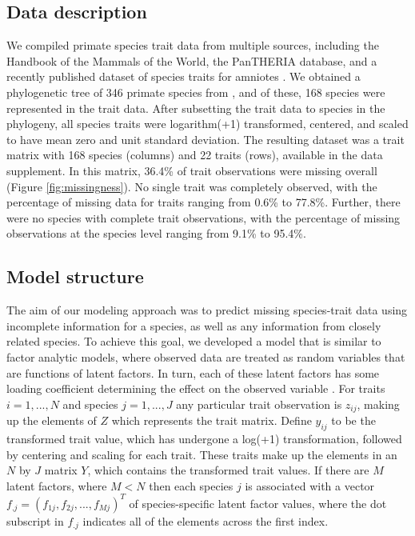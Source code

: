 \subsection{Data description}

We compiled primate species trait data from multiple sources, including the Handbook of the Mammals of the World, the PanTHERIA database, and a recently published dataset of species traits for amniotes \citep{myhrvold2015}.
We obtained a phylogenetic tree of 346 primate species from \cite{perelman2011}, and of these, 168 species were represented in the trait data.
After subsetting the trait data to species in the phylogeny, all species traits were logarithm(+1) transformed, centered, and scaled to have mean zero and unit standard deviation.
The resulting dataset was a trait matrix with 168 species (columns) and 22 traits (rows), available in the data supplement.
In this matrix, 36.4\% of trait observations were missing overall (Figure \ref{fig:missingness}).
No single trait was completely observed, with the percentage of missing data for traits ranging from 0.6\% to 77.8\%.
Further, there were no species with complete trait observations, with the percentage of missing observations at the species level ranging from 9.1\% to 95.4\%.

\subsection{Model structure}

The aim of our modeling approach was to predict missing species-trait data using incomplete information for a species, as well as any information from closely related species.
To achieve this goal, we developed a model that is similar to factor analytic models, where observed data are treated as random variables that are functions of latent factors. In turn, each of these latent factors has some loading coefficient determining the effect on the observed variable \citep{Lopes2004}.
For traits $i=1,..., N$ and species $j=1,..., J$ any particular trait observation is $z_{ij}$, making up the elements of $Z$ which represents the trait matrix.
Define $y_{ij}$ to be the transformed trait value, which has undergone a log(+1) transformation, followed by centering and scaling for each trait.
These traits make up the elements in an $N$ by $J$ matrix $Y$, which contains the transformed trait values.
If there are $M$ latent factors, where $M < N$ then each species $j$ is associated with a vector $f_{.j} = (f_{1j}, f_{2j}, ..., f_{Mj})^T$ of species-specific latent factor values, where the dot subscript in $f_{.j}$ indicates all of the elements across the first index.

